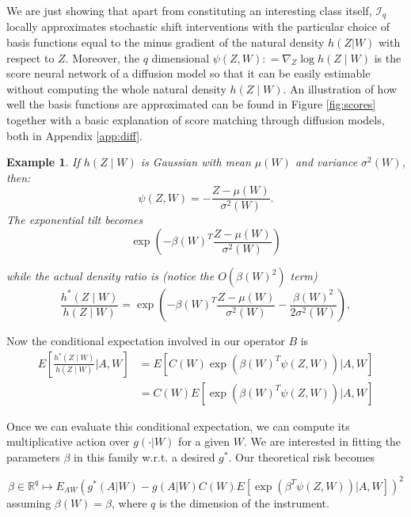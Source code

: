 \documentclass[12pt]{article}
\theoremstyle{thmstyleone}%
\theoremstyle{thmstyletwo}%
\newtheorem{example}{Example}%
\theoremstyle{thmstylethree}%
\begin{document}
	We are just showing that apart from constituting an interesting class itself,  $\mathcal{I}_q$ locally approximates stochastic shift interventions with the particular choice of basis functions equal to the minus gradient of the natural density $h(Z|W)$ with respect to $Z$. Moreover, the $q$ dimensional	$\psi(Z,W): = \nabla_Z \log h(Z \mid W)$ is the score neural network of a diffusion model \citep{feng2024optimalconvexmestimationscore} so that it can be easily estimable without computing the whole natural density $h(Z \mid W)$.  An illustration of how well the basis functions are approximated can be found in Figure \ref{fig:scores} together with a basic explanation of score matching through diffusion models, both in Appendix \ref{app:diff}. 



\begin{example}
	If $h(Z \mid W)$ is Gaussian with mean $\mu(W)$ and variance $\sigma^2(W)$, then:
	\[
	\psi(Z,W) = - \frac{Z - \mu(W)}{\sigma^2(W)}.
	\]
	The exponential tilt becomes
	\[
	\exp\left(-\beta(W)^T\frac{Z - \mu(W)}{\sigma^2(W)}\right)
	\]
	
	\noindent while the actual density ratio is (notice the $O(\beta(W)^2)$ term)
	\[
	\frac{h^*(Z \mid W)}{h(Z \mid W)} = \exp\left(-\beta(W)^T \frac{Z - \mu(W)}{\sigma^2(W)} - \frac{\beta(W)^2}{2 \sigma^2(W)}\right),
	\]
	
\end{example}


Now the conditional expectation involved in our operator $B$ is
	\[\begin{aligned}
{E}\left[ \frac{h^*(Z \mid W)}{h(Z \mid W)} \bigg| A, W \right] &=  	{E}\left[C(W){\exp\left(\beta(W)^T \psi(Z,W)\right)}\bigg| A, W \right] \\ &= C(W){E}\left[{\exp\left(\beta(W)^T \psi(Z,W)\right)}\bigg| A, W \right]\end{aligned}
\]
	
 Once we can evaluate this conditional expectation, we can compute its multiplicative action over $g(\cdot|W)$ for a given $W$. We are interested in fitting the parameters $\beta$ in this family w.r.t. a desired $g^*$. Our theoretical risk becomes

\begin{equation}\label{th:risk}
	\beta \in \mathbb{R}^q \longmapsto {E}_{AW}\left(g^*(A|W) -g(A|W )C(W){E}\left[{\exp\left(\beta^T \psi(Z,W)\right)}\bigg| A, W \right]\right)^2
	\end{equation}
assuming $	\beta (W) = \beta$, where $q$ is the dimension of the instrument. 
\end{document}
